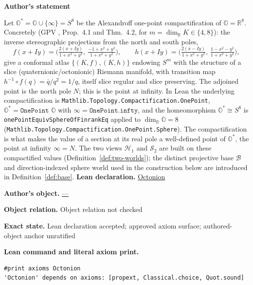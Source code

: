 \documentclass[11pt]{article}
\newcommand{\OO}{\mathbb{O}}
\newcommand{\RR}{\mathbb{R}}
\theoremstyle{plain}
\theoremstyle{definition}
\theoremstyle{remark}
\begin{document}
\medskip
\begin{tcolorbox}[provenancecard,title={37. Definition - The compactified octonions \$\textbackslash{}OO\textasciicircum{}\{*\}=S\textasciicircum{}8\$},title after break={37. Definition - The compactified octonions \$\textbackslash{}OO\textasciicircum{}\{*\}=S\textasciicircum{}8\$ (continued)}]
\textbf{Author's statement}\par
Let $\OO^{*}=\OO\cup\{\infty\}=S^8$ be the Alexandroff one-point compactification of $\OO=\RR^8$.
Concretely (GPV \cite{VS}, Prop.~4.1 and Thm.~4.2, for $m=\dim_{\RR}K\in\{4,8\}$): the inverse
stereographic projections from the north and south poles,
\[
f(x+Iy)=\Big(\tfrac{2(x+Iy)}{1+x^2+y^2},\ \tfrac{-1+x^2+y^2}{1+x^2+y^2}\Big),\qquad
h(x+Iy)=\Big(\tfrac{2(x-Iy)}{1+x^2+y^2},\ \tfrac{1-x^2-y^2}{1+x^2+y^2}\Big),
\]
give a conformal atlas $\{(K,f),(K,h)\}$ endowing $S^m$ with the structure of a slice
(quaternionic/octonionic) Riemann manifold, with transition map $h^{-1}\circ f(q)=\bar q/q^2=1/q$,
itself slice regular and slice preserving. The adjoined point is the north pole $N$; this is the
point at infinity. In Lean the underlying compactification is
\texttt{Mathlib.\-Topology.\-Compactification.\-OnePoint}, $\OO^{*}=\texttt{OnePoint }\OO$ with
$\infty=\texttt{OnePoint.infty}$, and the homeomorphism $\OO^{*}\cong S^8$ is
\texttt{onePoint\-Equiv\-Sphere\-Of\-Finrank\-Eq} applied to $\dim_{\RR}\OO=8$
(\texttt{Mathlib.\-Topology.\-Compactification.\-OnePoint.\-Sphere}). The compactification is what makes
the value of a section at its real pole a well-defined point of $\OO^{*}$, the point at
infinity $\infty=N$. The two views $\mathcal H_1$ and $\mathcal S_2$ are built on
these compactified values (Definition~\ref{def:two-worlds}); the distinct projective base
$\mathcal B$ and direction-indexed sphere world used in the construction below are introduced in
Definition~\ref{def:base}.
\tcblower
\textbf{Lean declaration.} \url{Octonion}
\par\textbf{Author's object.} \url{—}
\par\textbf{Object relation.} Object relation not checked
\par\textbf{Exact state.} Lean declaration accepted; approved axiom surface; authored-object anchor unratified
\par\smallskip\textbf{Lean command and literal axiom print.}
\begin{Verbatim}[breaklines=true,breakanywhere=true,fontsize=\small]
#print axioms Octonion
'Octonion' depends on axioms: [propext, Classical.choice, Quot.sound]

\end{Verbatim}
\end{tcolorbox}
\end{document}
